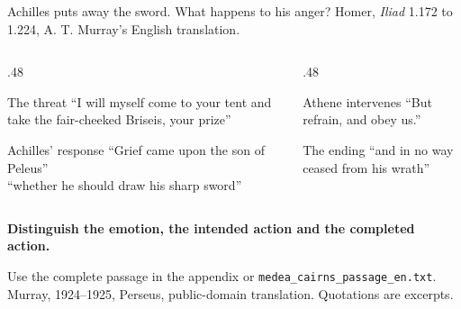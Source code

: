 \documentclass[aspectratio=169,10pt]{beamer}
\newcommand{\key}[1]{\textcolor{aegean}{\textbf{#1}}}
\newcommand{\source}[1]{\vfill{\scriptsize\color{slate}#1\par}}
\newcommand{\question}[1]{\medskip\par\key{#1}\par}
\begin{document}
\begin{frame}{Achilles puts away the sword. What happens to his anger?}
  \small Homer, \emph{Iliad} 1.172 to 1.224, A. T. Murray's English translation.
  \begin{columns}[T]
    \begin{column}{.48\textwidth}
      \begin{block}{The threat}
        “I will myself come to your tent and take the fair-cheeked Briseis, your prize”
      \end{block}
      \begin{block}{Achilles' response}
        “Grief came upon the son of Peleus”\\[4pt]
        “whether he should draw his sharp sword”
      \end{block}
    \end{column}
    \begin{column}{.48\textwidth}
      \begin{block}{Athene intervenes}
        “But refrain, and obey us.”
      \end{block}
      \begin{block}{The ending}
        “and in no way ceased from his wrath”
      \end{block}
    \end{column}
  \end{columns}
  \question{Distinguish the emotion, the intended action and the completed action.}
  \source{Use the complete passage in the appendix or \texttt{medea\_cairns\_passage\_en.txt}.\\
  Murray, 1924--1925, Perseus, public-domain translation. Quotations are excerpts.}
\end{frame}
\end{document}
